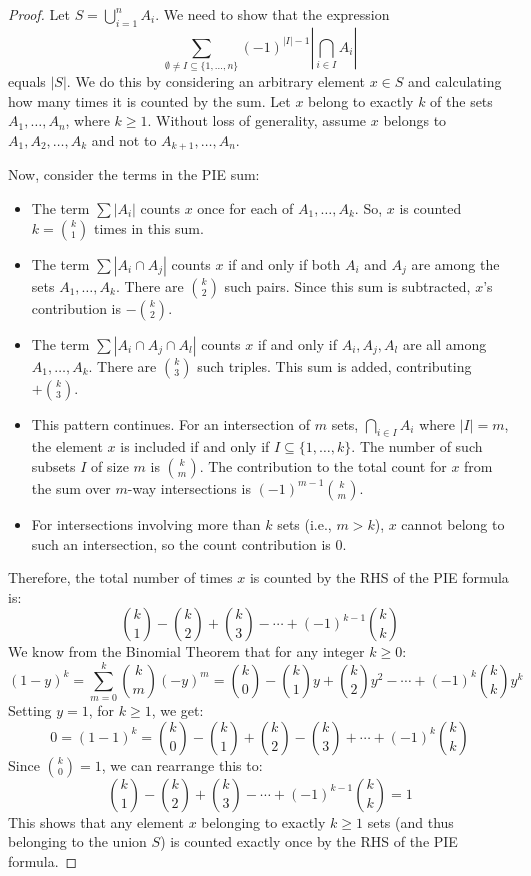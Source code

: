 \documentclass[11pt]{amsart}
\theoremstyle{plain}
\theoremstyle{definition}
\theoremstyle{remark}
\begin{document}
\begin{proof}
Let $S = \bigcup_{i=1}^n A_i$. We need to show that the expression
\[ \sum_{\emptyset \neq I \subseteq \{1, \ldots, n\}} (-1)^{|I|-1} \left| \bigcap_{i \in I} A_i \right| \]
equals $|S|$. We do this by considering an arbitrary element $x \in S$ and calculating how many times it is counted by the sum. Let $x$ belong to exactly $k$ of the sets $A_1, \ldots, A_n$, where $k \ge 1$. Without loss of generality, assume $x$ belongs to $A_1, A_2, \ldots, A_k$ and not to $A_{k+1}, \ldots, A_n$.

Now, consider the terms in the PIE sum:
\begin{itemize}
    \item The term $\sum |A_i|$ counts $x$ once for each of $A_1, \ldots, A_k$. So, $x$ is counted $k = \binom{k}{1}$ times in this sum.
    \item The term $\sum |A_i \cap A_j|$ counts $x$ if and only if both $A_i$ and $A_j$ are among the sets $A_1, \ldots, A_k$. There are $\binom{k}{2}$ such pairs. Since this sum is subtracted, $x$'s contribution is $-\binom{k}{2}$.
    \item The term $\sum |A_i \cap A_j \cap A_l|$ counts $x$ if and only if $A_i, A_j, A_l$ are all among $A_1, \ldots, A_k$. There are $\binom{k}{3}$ such triples. This sum is added, contributing $+\binom{k}{3}$.
    \item This pattern continues. For an intersection of $m$ sets, $\bigcap_{i \in I} A_i$ where $|I|=m$, the element $x$ is included if and only if $I \subseteq \{1, \ldots, k\}$. The number of such subsets $I$ of size $m$ is $\binom{k}{m}$. The contribution to the total count for $x$ from the sum over $m$-way intersections is $(-1)^{m-1} \binom{k}{m}$.
    \item For intersections involving more than $k$ sets (i.e., $m > k$), $x$ cannot belong to such an intersection, so the count contribution is 0.
\end{itemize}
Therefore, the total number of times $x$ is counted by the RHS of the PIE formula is:
\[ \binom{k}{1} - \binom{k}{2} + \binom{k}{3} - \cdots + (-1)^{k-1} \binom{k}{k} \]
We know from the Binomial Theorem that for any integer $k \ge 0$:
\[ (1 - y)^k = \sum_{m=0}^k \binom{k}{m} (-y)^m = \binom{k}{0} - \binom{k}{1}y + \binom{k}{2}y^2 - \cdots + (-1)^k \binom{k}{k}y^k \]
Setting $y=1$, for $k \ge 1$, we get:
\[ 0 = (1 - 1)^k = \binom{k}{0} - \binom{k}{1} + \binom{k}{2} - \binom{k}{3} + \cdots + (-1)^k \binom{k}{k} \]
Since $\binom{k}{0} = 1$, we can rearrange this to:
\[ \binom{k}{1} - \binom{k}{2} + \binom{k}{3} - \cdots + (-1)^{k-1} \binom{k}{k} = 1 \]
This shows that any element $x$ belonging to exactly $k \ge 1$ sets (and thus belonging to the union $S$) is counted exactly once by the RHS of the PIE formula.


\end{proof}
\end{document}
